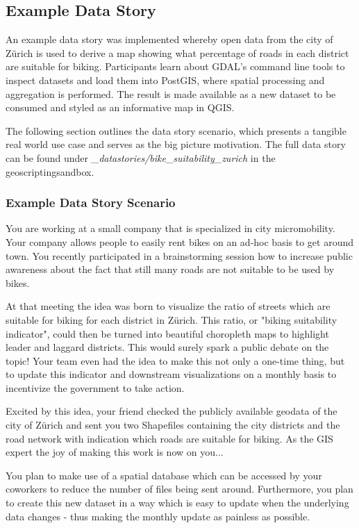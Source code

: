 \documentclass[11pt, a4paper, oneside, parskip=full-]{scrartcl}
\begin{document}
\subsection{Example Data Story}
An example data story was implemented whereby open data from the city of Zürich
is used to derive a map showing what percentage of roads in each district are
suitable for biking. Participants learn about GDAL's command line tools to
inspect datasets and load them into PostGIS, where spatial processing and
aggregation is performed. The result is made available as a new dataset to be
consumed and styled as an informative map in QGIS.

The following section outlines the data story scenario, which presents a
tangible real world use case and serves as the big picture motivation. The full
data story can be found under \emph{\_datastories/bike\_suitability\_zurich} in
the geoscriptingsandbox.

\subsubsection*{Example Data Story Scenario}

You are working at a small company that is specialized in city micromobility.
Your company allows people to easily rent bikes on an ad-hoc basis to get around
town. You recently participated in a brainstorming session how to increase
public awareness about the fact that still many roads are not suitable to be
used by bikes.

At that meeting the idea was born to visualize the ratio of streets which are
suitable for biking for each district in Zürich. This ratio, or "biking
suitability indicator", could then be turned into beautiful choropleth maps to
highlight leader and laggard districts. This would surely spark a public debate
on the topic! Your team even had the idea to make this not only a one-time
thing, but to update this indicator and downstream visualizations on a monthly
basis to incentivize the government to take action.

Excited by this idea, your friend checked the publicly available geodata of the
city of Zürich and sent you two Shapefiles containing the city districts and the
road network with indication which roads are suitable for biking. As the GIS
expert the joy of making this work is now on you...

You plan to make use of a spatial database which can be accessed by your
coworkers to reduce the number of files being sent around. Furthermore, you plan
to create this new dataset in a way which is easy to update when the underlying
data changes - thus making the monthly update as painless as possible.
\end{document}
